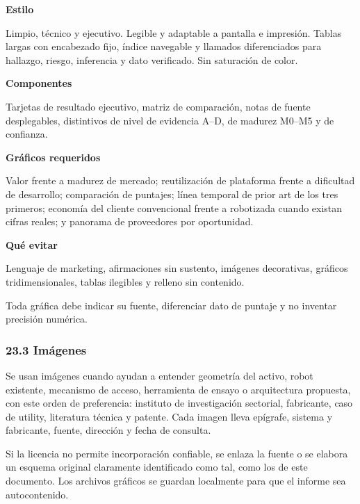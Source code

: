 \documentclass[11pt,a4paper]{article}
\newenvironment{tarjeta}[2]
  {\begin{tarjetabase}%
   {\sffamily\bfseries\color{navy}#1}%
   \ifstrempty{#2}{}{\\[1pt]{\sffamily\scriptsize\color{gray2}#2}}%
   \par\vspace{3pt}}
  {\end{tarjetabase}}
\begin{document}
\begin{tarjeta}{Estilo}{}
Limpio, técnico y ejecutivo. Legible y adaptable a pantalla e impresión. Tablas largas con encabezado fijo, índice navegable y llamados diferenciados para hallazgo, riesgo, inferencia y dato verificado. Sin saturación de color.

\end{tarjeta}
\begin{tarjeta}{Componentes}{}
Tarjetas de resultado ejecutivo, matriz de comparación, notas de fuente desplegables, distintivos de nivel de evidencia A–D, de madurez M0–M5 y de confianza.

\end{tarjeta}
\begin{tarjeta}{Gráficos requeridos}{}
Valor frente a madurez de mercado; reutilización de plataforma frente a dificultad de desarrollo; comparación de puntajes; línea temporal de prior art de los tres primeros; economía del cliente convencional frente a robotizada cuando existan cifras reales; y panorama de proveedores por oportunidad.

\end{tarjeta}
\begin{tarjeta}{Qué evitar}{}
Lenguaje de marketing, afirmaciones sin sustento, imágenes decorativas, gráficos tridimensionales, tablas ilegibles y relleno sin contenido.

\end{tarjeta}
Toda gráfica debe indicar su fuente, diferenciar dato de puntaje y no inventar precisión numérica.


\subsubsection*{23.3 Imágenes}

Se usan imágenes cuando ayudan a entender geometría del activo, robot existente, mecanismo de acceso, herramienta de ensayo o arquitectura propuesta, con este orden de preferencia: instituto de investigación sectorial, fabricante, caso de utility, literatura técnica y patente. Cada imagen lleva epígrafe, sistema y fabricante, fuente, dirección y fecha de consulta.

Si la licencia no permite incorporación confiable, se enlaza la fuente o se elabora un esquema original claramente identificado como tal, como los de este documento. Los archivos gráficos se guardan localmente para que el informe sea autocontenido.
\end{document}
